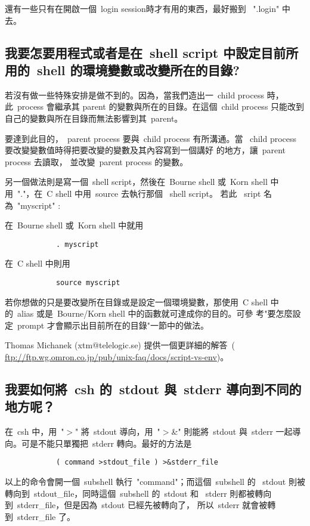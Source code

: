 \documentclass{article}
\begin{document}
\begin{CJK*}{Bg5}{ming}
	還有一些只有在開啟一個~login session時才有用的東西，最好搬到 
	~".login" 中去。

\subsection{我要怎要用程式或者是在~shell script 中設定目前所用的~shell 
	的環境變數或改變所在的目錄?}

	若沒有做一些特殊安排是做不到的。因為，當我們造出一~child process 
	時，此~process 會繼承其 parent 的變數與所在的目錄。在這個~child 
	process 只能改到自己的變數與所在目錄而無法影響到其~parent。

	要達到此目的，~parent process 要與~child process 有所溝通。當 
	~child process 要改變變數值時得把要改變的變數及其內容寫到一個講好
	的地方，讓~parent process 去讀取， 並改變~parent process 的變數。


	另一個做法則是寫一個~shell script，然後在~Bourne shell 或~Korn 
	shell 中用~"."，在~C shell 中用~source 去執行那個 ~shell script。
	若此 ~sript 名為~"myscript" :

	在~Bourne shell 或~Korn shell 中就用
\begin{verbatim}
        	. myscript
\end{verbatim}
	在~C shell 中則用
\begin{verbatim}
	        source myscript
\end{verbatim}
	若你想做的只是要改變所在目錄或是設定一個環境變數，那使用~C shell 
	中的~alias 或是~Bourne/Korn shell 中的函數就可達成你的目的。可參
	考"要怎麼設定~prompt 才會顯示出目前所在的目錄"一節中的做法。

	Thomas Michanek (xtm@telelogic.se) 提供一個更詳細的解答~( 
	\url{ftp://ftp.wg.omron.co.jp/pub/unix-faq/docs/script-vs-env})。

\subsection{我要如何將~csh 的~stdout 與~stderr 導向到不同的地方呢？}

	在~csh 中，用~"$>$" 將~stdout 導向，用~"$>$\&" 則能將~stdout 與~stderr 
	一起導向。可是不能只單獨把~stderr 轉向。最好的方法是
\begin{verbatim}
	        ( command >stdout_file ) >&stderr_file
\end{verbatim}
	以上的命令會開一個~subshell 執行~"command"；而這個~subshell 的 
	~stdout 則被轉向到~stdout\_file，同時這個~subshell 的~stdout 和 
	~stderr 則都被轉向到~stderr\_file，但是因為~stdout 已經先被轉向了，
	所以~stderr 就會被轉到~stderr\_file 了。


\end{CJK*}
\end{document}
